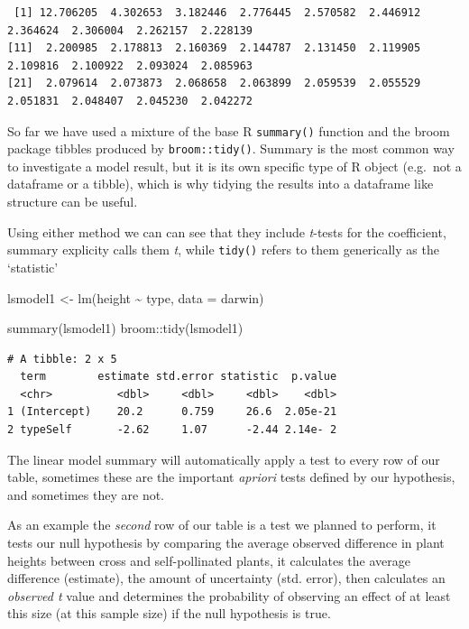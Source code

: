 \documentclass[
]{book}
\newenvironment{Shaded}{\begin{snugshade}}{\end{snugshade}}
\newcommand{\AttributeTok}[1]{\textcolor[rgb]{0.77,0.63,0.00}{#1}}
\newcommand{\FunctionTok}[1]{\textcolor[rgb]{0.00,0.00,0.00}{#1}}
\newcommand{\NormalTok}[1]{#1}
\newcommand{\OtherTok}[1]{\textcolor[rgb]{0.56,0.35,0.01}{#1}}
\newcommand{\SpecialCharTok}[1]{\textcolor[rgb]{0.00,0.00,0.00}{#1}}
\begin{document}
\begin{verbatim}
 [1] 12.706205  4.302653  3.182446  2.776445  2.570582  2.446912  2.364624  2.306004  2.262157  2.228139
[11]  2.200985  2.178813  2.160369  2.144787  2.131450  2.119905  2.109816  2.100922  2.093024  2.085963
[21]  2.079614  2.073873  2.068658  2.063899  2.059539  2.055529  2.051831  2.048407  2.045230  2.042272
\end{verbatim}

So far we have used a mixture of the base R \texttt{summary()} function and the broom package tibbles produced by \texttt{broom::tidy()}. Summary is the most common way to investigate a model result, but it is its own specific type of R object (e.g.~not a dataframe or a tibble), which is why tidying the results into a dataframe like structure can be useful.

Using either method we can can see that they include \emph{t}-tests for the coefficient, summary explicity calls them \emph{t}, while \texttt{tidy()} refers to them generically as the `statistic'

\begin{Shaded}
\begin{Highlighting}[]
\NormalTok{lsmodel1 }\OtherTok{\textless{}{-}} \FunctionTok{lm}\NormalTok{(height }\SpecialCharTok{\textasciitilde{}}\NormalTok{ type, }\AttributeTok{data =}\NormalTok{ darwin)}
\end{Highlighting}
\end{Shaded}

\begin{Shaded}
\begin{Highlighting}[]
\FunctionTok{summary}\NormalTok{(lsmodel1)}
\NormalTok{broom}\SpecialCharTok{::}\FunctionTok{tidy}\NormalTok{(lsmodel1)}
\end{Highlighting}
\end{Shaded}

\begin{verbatim}
# A tibble: 2 x 5
  term        estimate std.error statistic  p.value
  <chr>          <dbl>     <dbl>     <dbl>    <dbl>
1 (Intercept)    20.2      0.759     26.6  2.05e-21
2 typeSelf       -2.62     1.07      -2.44 2.14e- 2
\end{verbatim}

The linear model summary will automatically apply a test to every row of our table, sometimes these are the important \emph{apriori} tests defined by our hypothesis, and sometimes they are not.

As an example the \emph{second} row of our table is a test we planned to perform, it tests our null hypothesis by comparing the average observed difference in plant heights between cross and self-pollinated plants, it calculates the average difference (estimate), the amount of uncertainty (std. error), then calculates an \emph{observed t} value and determines the probability of observing an effect of at least this size (at this sample size) if the null hypothesis is true.
\end{document}
